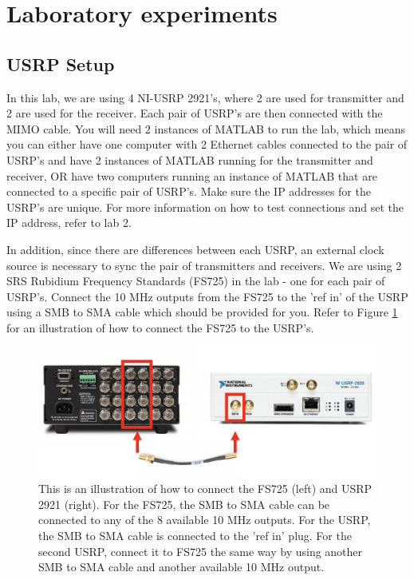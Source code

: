 \documentclass{book}
\begin{document}

\section{Laboratory experiments}
\subsection{USRP Setup}
In this lab, we are using 4 NI-USRP 2921's, where 2 are used for transmitter and 2 are used for the receiver. Each pair of USRP's are then connected with the MIMO cable. You will need 2 instances of MATLAB to run the lab, which means you can either have one computer with 2 Ethernet cables connected to the pair of USRP's and have 2 instances of MATLAB running for the transmitter and receiver, OR have two computers running an instance of MATLAB that are connected to a specific pair of USRP's. Make sure the IP addresses for the USRP's are unique. For more information on how to test connections and set the IP address, refer to lab 2.

In addition, since there are differences between each USRP, an external clock source is necessary to sync the pair of transmitters and receivers. We are using 2 SRS Rubidium Frequency Standards (FS725) in the lab - one for each pair of USRP's. Connect the 10 MHz outputs from the FS725 to the 'ref in' of the USRP using a SMB to SMA cable which should be provided for you. Refer to Figure \ref{fs725} for an illustration of how to connect the FS725 to the USRP's.

\begin{figure}
\begin{center}
\includegraphics[width=\columnwidth]{lab11/figure1.png}
\caption{This is an illustration of how to connect the FS725 (left) and USRP 2921 (right). For the FS725, the SMB to SMA cable can be connected to any of the 8 available 10 MHz outputs. For the USRP, the SMB to SMA cable is connected to the 'ref in' plug. For the second USRP, connect it to FS725 the same way by using another SMB to SMA cable and another available 10 MHz output.} \label{fs725}
\end{center} 
\end{figure}
\end{document}
